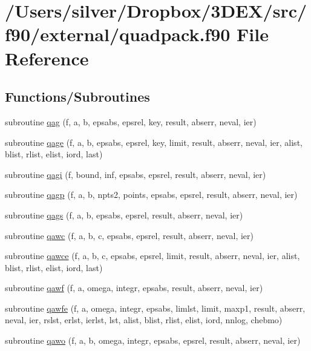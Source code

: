 \hypertarget{quadpack_8f90}{
\section{/Users/silver/Dropbox/3DEX/src/f90/external/quadpack.f90 File Reference}
\label{quadpack_8f90}
}
\subsection*{Functions/Subroutines}
\begin{DoxyCompactItemize}
\item 
subroutine \hyperlink{quadpack_8f90_a44906a25a31588f7e4f41f0e5253193a}{qag} (f, a, b, epsabs, epsrel, key, result, abserr, neval, ier)
\item 
subroutine \hyperlink{quadpack_8f90_ab602437c218a2c74d6a13f9462f98854}{qage} (f, a, b, epsabs, epsrel, key, limit, result, abserr, neval, ier, alist, blist, rlist, elist, iord, last)
\item 
subroutine \hyperlink{quadpack_8f90_ac59eaf7c56c1d421d129425895fa0107}{qagi} (f, bound, inf, epsabs, epsrel, result, abserr, neval, ier)
\item 
subroutine \hyperlink{quadpack_8f90_a99cf2a02a14029fad4762555f04cac0e}{qagp} (f, a, b, npts2, points, epsabs, epsrel, result, abserr, neval, ier)
\item 
subroutine \hyperlink{quadpack_8f90_a00a116a91c0699e57d15abc61dcd531b}{qags} (f, a, b, epsabs, epsrel, result, abserr, neval, ier)
\item 
subroutine \hyperlink{quadpack_8f90_a4cea9ad83248026209e702bb01abb7da}{qawc} (f, a, b, c, epsabs, epsrel, result, abserr, neval, ier)
\item 
subroutine \hyperlink{quadpack_8f90_a51d7f754a9214f7490c035740fc0aef7}{qawce} (f, a, b, c, epsabs, epsrel, limit, result, abserr, neval, ier, alist, blist, rlist, elist, iord, last)
\item 
subroutine \hyperlink{quadpack_8f90_aefd54eff8d0418a0f533f571d80ec5e5}{qawf} (f, a, omega, integr, epsabs, result, abserr, neval, ier)
\item 
subroutine \hyperlink{quadpack_8f90_abe17af7f3ad5cf264791d326bbd15192}{qawfe} (f, a, omega, integr, epsabs, limlst, limit, maxp1, result, abserr, neval, ier, rslst, erlst, ierlst, lst, alist, blist, rlist, elist, iord, nnlog, chebmo)
\item 
subroutine \hyperlink{quadpack_8f90_aaa4f15baf0dadd3383219f0d42a62752}{qawo} (f, a, b, omega, integr, epsabs, epsrel, result, abserr, neval, ier)

\end{DoxyCompactItemize}
